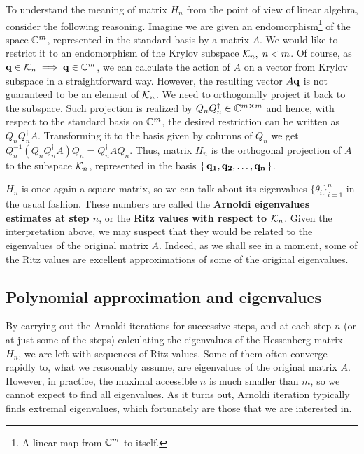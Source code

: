To understand the meaning
of matrix \(H_n\) from the point of view of linear algebra, consider the following reasoning. Imagine we are
given an endomorphism\footnote{A linear map from \(\mathbb{C}^m\) to itself.}
of the space \(\mathbb{C}^m\), represented in the standard basis by a matrix \(A\).
We would like to restrict it to an endomorphism of the Krylov subspace \(\mathcal{K}_{n},\; n < m\). Of course,
as \(\vectorbold{q} \in \K{n} \implies \vectorbold{q} \in \CC^m\), we can calculate the action of \(A\) on a vector
from Krylov subspace in a straightforward way. However, the resulting vector \(A\vectorbold{q}\) is not guaranteed
to be an element of \(\mathcal{K}_{n}\). We need to orthogonally project it back to the subspace. Such projection
is realized by \(Q_n Q^{\dagger}_n \in \mathbb{C}^{m\cross m}\) and hence, with respect to the standard basis on \(\mathbb{C}^m\),
the desired restriction can be written as \(Q_n Q^{\dagger}_n A\). Transforming it to the basis given by columns of
\(Q_n\) we get \( Q_n^{-1}\left(Q_n Q^{\dagger}_n A\right)Q_n = Q^{\dagger}_n A Q_n\). Thus, matrix \(H_n\)
is the orthogonal projection of \(A\) to the subspace \(\mathcal{K}_{n}\), represented in the basis
\(\{\,\vectorbold{q_1},\vectorbold{q_2},\ldots,\vectorbold{q_n}\,\}\).

\(H_n\) is once again a square matrix, so we can talk about its eigenvalues \(\{\theta_i\}_{i = 1}^n\)
in the usual fashion. These numbers are called the \textbf{Arnoldi eigenvalues estimates at step \(n\)}, or
the \textbf{Ritz values with respect to \(\mathcal{K}_{n}\)}.
Given the interpretation above, we may suspect that they would be related to the eigenvalues of the original matrix \(A\).
Indeed, as we shall see in a moment, some of the Ritz values are excellent approximations of some of the
original eigenvalues.


\subsection{Polynomial approximation and eigenvalues}

By carrying out the Arnoldi iterations for successive steps, and at each step \(n\) (or at just some of the steps)
calculating the eigenvalues of the Hessenberg matrix \(H_n\), we are left with sequences of Ritz values. Some
of them often converge rapidly to, what we reasonably assume, are eigenvalues of the original matrix \(A\).
However, in practice, the maximal accessible \(n\) is much smaller than \(m\), so we cannot expect to find
all eigenvalues. As it turns out, Arnoldi iteration typically finds extremal eigenvalues, which fortunately
are those that we are interested in.

